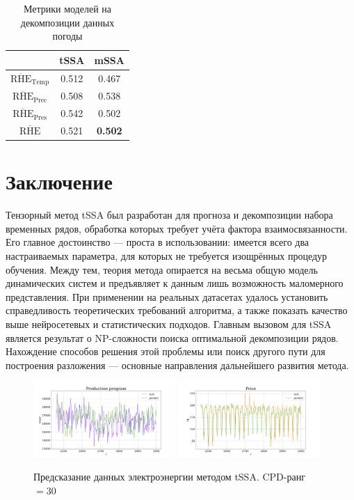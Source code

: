 	\def\arraystretch{1.2}
	\begin{table}[h!]
		\centering
		\caption{Метрики моделей на декомпозиции данных погоды}\label{tab:decomp_weather_results}
		\begin{tabular}{|c|c|c|}
			\hline
			& tSSA  & mSSA           \\ \hline
			$ \overline{\text{RHE}}_{\text{Temp}} $   & 0.512 & 0.467          \\ \hline
			$ \overline{\text{RHE}}_{\text{Prec}} $ & 0.508 & 0.538          \\ \hline
			$ \overline{\text{RHE}}_{\text{Pres}} $   & 0.542 & 0.502          \\ \hline
			$ \overline{\text{RHE}} $         & 0.521 & \textbf{0.502} \\ \hline
		\end{tabular}
	\end{table}	
	
	\section{Заключение}
	
	Тензорный метод tSSA был разработан для прогноза и декомпозиции набора временных рядов, обработка которых требует учёта фактора взаимосвязанности. Его главное достоинство --- проста в использовании: имеется всего два настраиваемых параметра, для которых не требуется изощрённых процедур обучения. Между тем, теория метода опирается на весьма общую модель динамических систем и предъявляет к данным лишь возможность маломерного представления. При применении на реальных датасетах удалось установить справедливость теоретических требований алгоритма, а также показать качество выше нейросетевых и статистических подходов. Главным вызовом для tSSA является результат о NP-сложности поиска оптимальной декомпозиции рядов. Нахождение способов решения этой проблемы или поиск другого пути для построения разложения --- основные направления дальнейшего развития метода.
	
	\begin{figure}[h]
		\centering
		\includegraphics[width=0.48\textwidth, keepaspectratio]{../../experiments/electricity/tssa/figs/prediction/cpd_rank_30/Production_program.png}
		\includegraphics[width=0.48\textwidth, keepaspectratio]{../../experiments/electricity/tssa/figs/prediction/cpd_rank_30/Price.png}
		\caption{Предсказание данных электроэнергии методом tSSA. CPD-ранг $ = 30 $}\label{fig:tssa_electr_pred}
	\end{figure}
	
